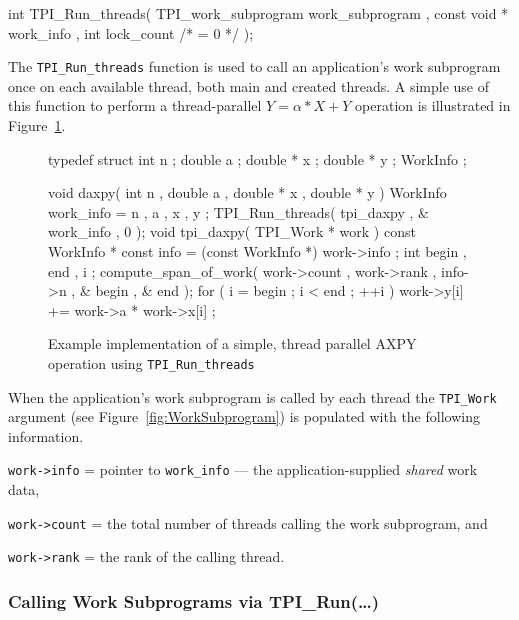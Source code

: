 \begin{center}
\small
\begin{boxedverbatim}
int TPI_Run_threads( TPI_work_subprogram work_subprogram  ,
                     const void *        work_info ,
                     int                 lock_count /* = 0 */ );
\end{boxedverbatim}
\end{center}

The \texttt{TPI\_Run\_threads} function is used to call an application's work subprogram 
once on each available thread, both main and created threads.
%
A simple use of this function to perform a thread-parallel \mbox{$Y=\alpha*X+Y$} operation is illustrated in Figure~\ref{fig:WorkSubprogramAXPY}.

\begin{figure}[h]
\small
\center
\begin{boxedverbatim}
typedef struct {
  int n ;
  double a ;
  double * x ;
  double * y ;
} WorkInfo ;

void daxpy( int n , double a , double * x , double * y )
{
  WorkInfo work_info = { n , a , x , y };
  TPI_Run_threads( tpi_daxpy , & work_info , 0 );
}
void tpi_daxpy( TPI_Work * work )
{
  const WorkInfo * const info = (const WorkInfo *) work->info ;
  int begin , end , i ;
  compute_span_of_work( work->count , work->rank , info->n , & begin , & end );
  for ( i = begin ; i < end ; ++i ) { 
    work->y[i] += work->a * work->x[i] ; 
  }
}
\end{boxedverbatim}
\caption{Example implementation of a simple, thread parallel AXPY operation using \texttt{TPI\_Run\_threads}}
\label{fig:WorkSubprogramAXPY}
\end{figure}


When the application's work subprogram is called by each thread the \texttt{TPI\_Work} argument (see Figure~\ref{fig:WorkSubprogram}) is populated with the following information.
%
\begin{blist}
\item \texttt{work->info} = pointer to \texttt{work\_info} --- the application-supplied \emph{shared} work data, 
\item \texttt{work->count} = the total number of threads calling the work subprogram, and
\item \texttt{work->rank} = the rank of the calling thread.
\end{blist}

\clearpage
\subsubsection{Calling Work Subprograms via TPI\_Run(\ldots)}

